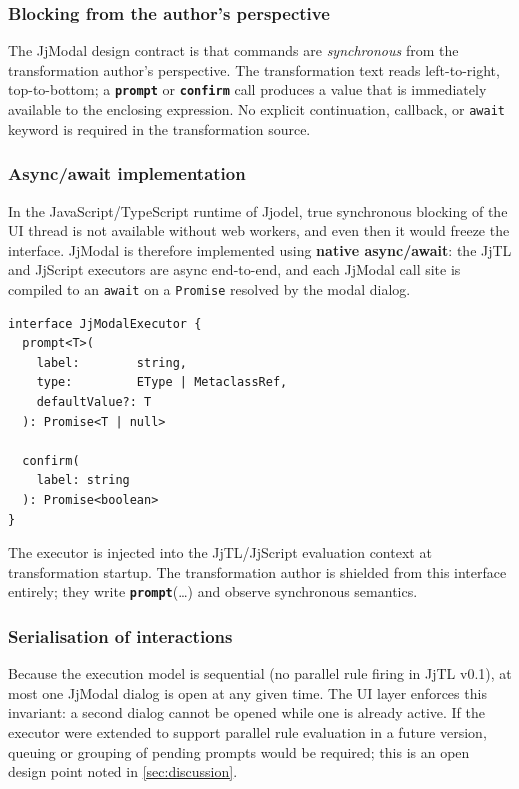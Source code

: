 \documentclass[11pt,a4paper]{article}
\newcommand{\jjmodal}{\textsf{JjModal}}
\newcommand{\jjtl}{\textsf{JjTL}}
\newcommand{\kw}[1]{\texttt{\textbf{#1}}}
\begin{document}
\subsubsection{Blocking from the author's perspective}
 
The \jjmodal{} design contract is that commands are \emph{synchronous}
from the transformation author's perspective. The transformation text
reads left-to-right, top-to-bottom; a \kw{prompt} or \kw{confirm} call
produces a value that is immediately available to the enclosing
expression. No explicit continuation, callback, or \texttt{await}
keyword is required in the transformation source.
 
\subsubsection{Async/await implementation}
 
In the JavaScript/TypeScript runtime of Jjodel, true synchronous blocking
of the UI thread is not available without web workers, and even then it
would freeze the interface. \jjmodal{} is therefore implemented using
\textbf{native async/await}: the \jjtl{} and \textsf{JjScript} executors
are async end-to-end, and each \jjmodal{} call site is compiled to an
\texttt{await} on a \texttt{Promise} resolved by the modal dialog.
 
\begin{lstlisting}[style=grammar,caption={JjModal execution interface (TypeScript)}]
interface JjModalExecutor {
  prompt<T>(
    label:        string,
    type:         EType | MetaclassRef,
    defaultValue?: T
  ): Promise<T | null>
 
  confirm(
    label: string
  ): Promise<boolean>
}
\end{lstlisting}
 
The executor is injected into the \jjtl{}/\textsf{JjScript} evaluation
context at transformation startup. The transformation author is shielded
from this interface entirely; they write \kw{prompt}(\ldots) and observe
synchronous semantics.
 
\subsubsection{Serialisation of interactions}
 
Because the execution model is sequential (no parallel rule firing in
\jjtl{} v0.1), at most one \jjmodal{} dialog is open at any given time.
The UI layer enforces this invariant: a second dialog cannot be opened
while one is already active. If the executor were extended to support
parallel rule evaluation in a future version, queuing or grouping of
pending prompts would be required; this is an open design point noted in
\cref{sec:discussion}.
 
\end{document}

